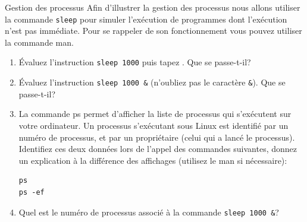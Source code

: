 \begin{exercice}
  \begin{exercicelet}{Gestion des processus}
    Afin d'illustrer la gestion des processus nous allons utiliser la
    commande \texttt{sleep} pour simuler l'exécution de programmes dont
    l'exécution n'est pas immédiate. Pour se rappeler de son
    fonctionnement vous pouvez utiliser la commande man.
    \begin{enumerate}\setcounter{enumi}{\value{cnti}}
      \setcounter{cnti}{\value{enumi}}
    \item Évaluez l'instruction \verb|sleep 1000| puis tapez
      \Ctrl{}. Que se passe-t-il?
    \item Évaluez l'instruction \verb|sleep 1000 &| (n'oubliez pas le
      caractère \verb|&|). Que se passe-t-il?
    \item La commande ps permet d'afficher la liste de processus qui
      s'exécutent sur votre ordinateur. Un processus s'exécutant sous
      Linux est identifié par un numéro de processus, et par un
      propriétaire (celui qui a lancé le processus). Identifiez ces deux
      données lors de l'appel des commandes suivantes, donnez un
      explication à la différence des affichages (utilisez le man si
      nécessaire):
\begin{verbatim}
ps
ps -ef
\end{verbatim}
    \item Quel est le numéro de processus associé à la commande
      \verb|sleep 1000 &|?
    \end{enumerate}
  \end{exercicelet}
\end{exercice}

